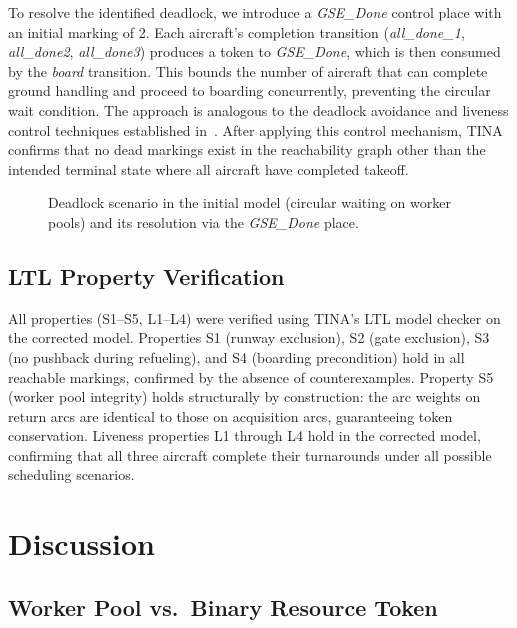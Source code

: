 \documentclass[conference]{IEEEtran}
\begin{document}
To resolve the identified deadlock, we introduce a \textit{GSE\_Done} control
place with an initial marking of 2. Each aircraft's completion transition
(\textit{all\_done\_1}, \textit{all\_done2}, \textit{all\_done3}) produces a
token to \textit{GSE\_Done}, which is then consumed by the \textit{board}
transition. This bounds the number of aircraft that can complete ground
handling and proceed to boarding concurrently, preventing the circular wait
condition. The approach is analogous to the deadlock avoidance and liveness
control techniques established in~\cite{b4,b5}. After applying this control
mechanism, TINA confirms that no dead markings exist in the reachability graph
other than the intended terminal state where all aircraft have completed takeoff.

\begin{figure}[htbp]
  \centering
  \caption{Deadlock scenario in the initial model (circular waiting on worker
           pools) and its resolution via the \textit{GSE\_Done} place.}
  \label{fig:deadlock}
\end{figure}

\subsection{LTL Property Verification}

All properties (S1--S5, L1--L4) were verified using TINA's LTL model checker on
the corrected model. Properties S1 (runway exclusion), S2 (gate exclusion), S3
(no pushback during refueling), and S4 (boarding precondition) hold in all
reachable markings, confirmed by the absence of counterexamples. Property S5
(worker pool integrity) holds structurally by construction: the arc weights on
return arcs are identical to those on acquisition arcs, guaranteeing token
conservation. Liveness properties L1 through L4 hold in the corrected model,
confirming that all three aircraft complete their turnarounds under all possible
scheduling scenarios.


\section{Discussion}

\subsection{Worker Pool vs.\ Binary Resource Token}
\end{document}
